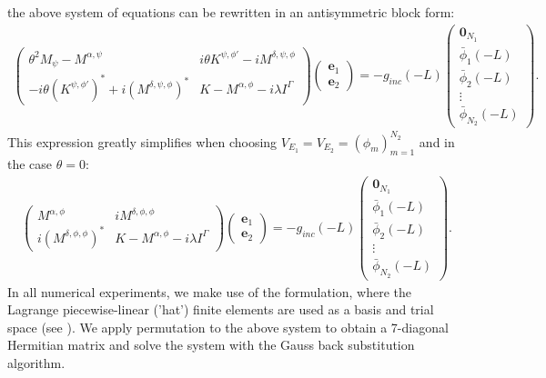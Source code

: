 \documentclass[proc]{edpsmath}
\begin{document}
the above system of equations can be rewritten in an antisymmetric block form:
\begin{align*}
\left(\begin{matrix}
\theta^2 M_{\psi}-M^{\alpha,\psi} & i\theta K^{\psi,\phi'}-i M^{\delta,\psi,\phi} \\
-i\theta (K^{\psi,\phi'})^{*}+i (M^{\delta,\psi,\phi})^{*} & K-M^{\alpha,\phi}-i\lambda I^{\Gamma}
\end{matrix}\right)
\left(
\begin{matrix}
\boldsymbol{e}_1\\
\boldsymbol{e}_2
\end{matrix}
\right)=-g_{inc}(-L)
\left(
\begin{matrix}
\boldsymbol{0}_{N_{1}}\\
\bar{\phi}_{1}(-L)\\
\bar{\phi}_{2}(-L)\\
\vdots\\
\bar{\phi}_{N_{2}}(-L)
\end{matrix}
\right).
\end{align*}
This expression greatly simplifies when choosing $V_{E_{1}}=V_{E_{2}}=\left(\phi_{m}\right)_{m=1}^{N_{2}}$ and in the case $\theta=0$:
\begin{align}
\label{eq:simple_system}
\left(\begin{matrix}
M^{\alpha,\phi} & i M^{\delta,\phi,\phi} \\
i (M^{\delta,\phi,\phi})^{*} & K-M^{\alpha,\phi}-i\lambda I^{\Gamma}
\end{matrix}\right)
\left(
\begin{matrix}
\boldsymbol{e}_1\\ 
\boldsymbol{e}_2
\end{matrix}
\right)=-g_{inc}(-L)
\left(
\begin{matrix}
\boldsymbol{0}_{N_{1}}\\
\bar{\phi}_{1}(-L)\\
\bar{\phi}_{2}(-L)\\
\vdots\\
\bar{\phi}_{N_{2}}(-L)
\end{matrix}
\right).
\end{align}
In all numerical experiments, we make use of the formulation, where the Lagrange piecewise-linear ('hat') finite elements are used as a 
basis and trial space (see \cite{brenner}). We apply permutation to the above system 
to obtain a 7-diagonal Hermitian matrix and solve the system with the Gauss back substitution algorithm. 
\end{document}
